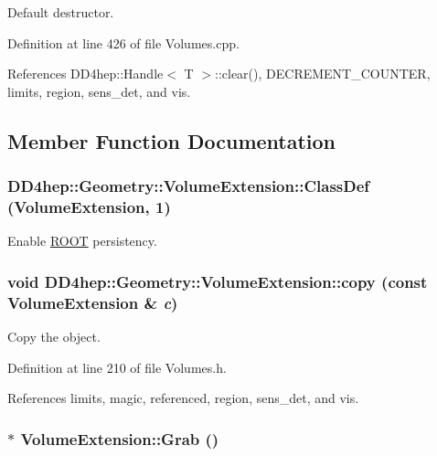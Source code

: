 Default destructor. 

Definition at line 426 of file Volumes.cpp.

References DD4hep::Handle$<$ T $>$::clear(), DECREMENT\_\-COUNTER, limits, region, sens\_\-det, and vis.

\subsection{Member Function Documentation}
\hypertarget{class_d_d4hep_1_1_geometry_1_1_volume_extension_abdf0afaa48f61a81e56d99f4a7f2ae6b}{
\subsubsection[{ClassDef}]{\setlength{\rightskip}{0pt plus 5cm}DD4hep::Geometry::VolumeExtension::ClassDef ({\bf VolumeExtension}, \/  1)}}
\label{class_d_d4hep_1_1_geometry_1_1_volume_extension_abdf0afaa48f61a81e56d99f4a7f2ae6b}


Enable \hyperlink{namespace_r_o_o_t}{ROOT} persistency. \hypertarget{class_d_d4hep_1_1_geometry_1_1_volume_extension_a9384fd683e751216c07236b8f1e400c2}{
\subsubsection[{copy}]{\setlength{\rightskip}{0pt plus 5cm}void DD4hep::Geometry::VolumeExtension::copy (const {\bf VolumeExtension} \& {\em c})}}
\label{class_d_d4hep_1_1_geometry_1_1_volume_extension_a9384fd683e751216c07236b8f1e400c2}


Copy the object. 

Definition at line 210 of file Volumes.h.

References limits, magic, referenced, region, sens\_\-det, and vis.\hypertarget{class_d_d4hep_1_1_geometry_1_1_volume_extension_adc072e1c3a4be273940579938c6be398}{
\subsubsection[{Grab}]{ $\ast$ VolumeExtension::Grab ()}}
\label{class_d_d4hep_1_1_geometry_1_1_volume_extension_adc072e1c3a4be273940579938c6be398}


